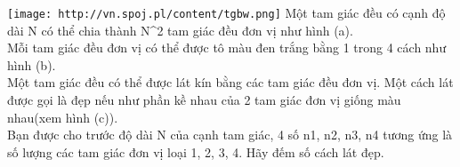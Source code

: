 \texttt{[image: http://vn.spoj.pl/content/tgbw.png]}   Một tam giác đều có cạnh độ dài N có thể chia thành N^2 tam giác đều đơn vị như hình (a).   
\\   Mỗi tam giác đều đơn vị có thể được tô màu đen trắng bằng 1 trong 4 cách như hình (b).   
\\   Một tam giác đều có thể được lát kín bằng các tam giác đều đơn vị. Một cách lát được gọi là đẹp nếu như phần kề nhau của 2 tam giác đơn vị giống màu nhau(xem hình (c)).   
\\   Bạn được cho trước độ dài N của cạnh tam giác, 4 số n1, n2, n3, n4 tương ứng là số lượng các tam giác đơn vị loại 1, 2, 3, 4. Hãy đếm số cách lát đẹp.
